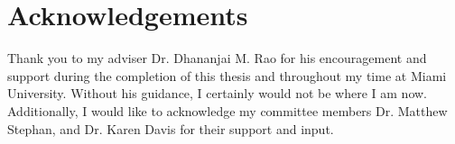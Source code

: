 \clearpage
\section*{\centering Acknowledgements}
\begin{flushleft}
Thank you to my adviser Dr. Dhananjai M. Rao for his encouragement and support during the completion of this thesis and throughout my time at Miami University.  Without his guidance, I certainly would not be where I am now.  Additionally, I would like to acknowledge my committee members Dr. Matthew Stephan, and Dr. Karen Davis for their support and input. 

~\newline

\end{flushleft}
